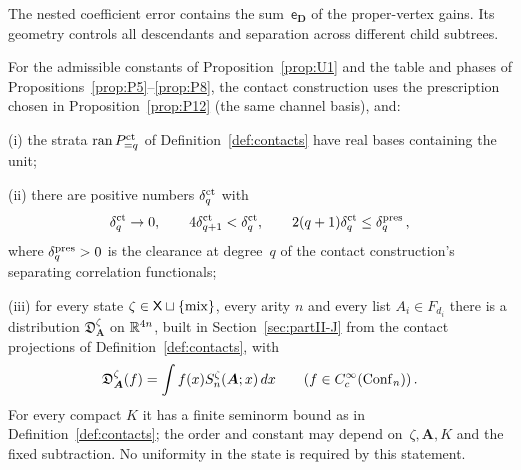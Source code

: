 \begin{remark}
The nested coefficient error contains the sum~$\mathsf e_{\boldsymbol D}$ of the proper-vertex gains. Its geometry controls all descendants and separation across different child subtrees.
\end{remark}

\begin{proposition}\label{prop:P13}
For the admissible constants of Proposition~\ref{prop:U1} and the table and phases of Propositions~\ref{prop:P5}--\ref{prop:P8}, the contact construction uses the prescription chosen in Proposition~\ref{prop:P12} (the same channel basis), and:

(i) the strata $\operatorname{ran}P^{\rm ct}_{=q}$ of Definition~\ref{def:contacts} have real bases containing the unit;

(ii) there are positive numbers $\delta_q^{\rm ct}$ with
\begin{equation}\label{eq:P13-1}
\delta_q^{\rm ct}\to0,\qquad 4\delta_{q+1}^{\rm ct}<\delta_q^{\rm ct},\qquad 2(q+1)\delta_q^{\rm ct}\le\delta_q^{\rm pres}\,,
\end{equation}
where $\delta_q^{\rm pres}>0$ is the clearance at degree~$q$ of the contact construction's separating correlation functionals;

(iii) for every state $\zeta\in\mathsf{X}\sqcup\{\mathrm{mix}\}$, every arity $n$ and every list $A_i\in F_{d_i}$ there is a distribution $\mathfrak D_{\boldsymbol A}^\zeta$ on $\mathbb{R}^{4n}$, built in Section~\ref{sec:partII-J} from the contact projections of Definition~\ref{def:contacts}, with
\begin{equation}\label{eq:P13-2}
\mathfrak D_{\boldsymbol A}^\zeta(f)=\int f(x)S_n^\zeta(\boldsymbol A;x)\,dx\qquad(f\in C_c^\infty(\mathrm{Conf}_{n}))\,.
\end{equation}
For every compact $K$ it has a finite seminorm bound as in Definition~\ref{def:contacts}; the order and constant may depend on~$\zeta,\boldsymbol A,K$ and the fixed subtraction. No uniformity in the state is required by this statement.
\end{proposition}

